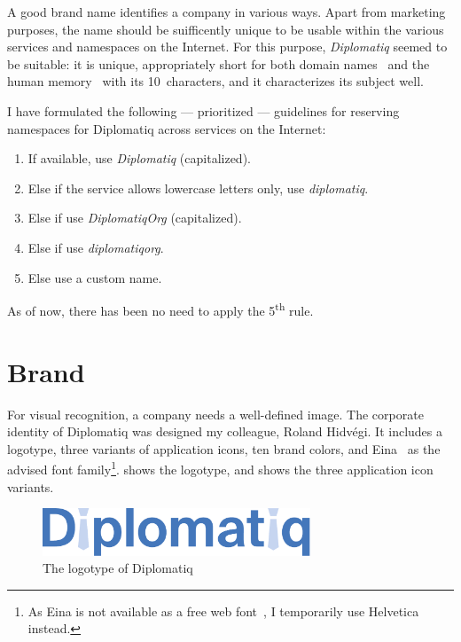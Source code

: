 A good brand name identifies a company in various ways. Apart from marketing purposes, the name should be suifficently unique to be usable within the various services and namespaces on the Internet. For this purpose, \emph{Diplomatiq} seemed to be suitable: it is unique, appropriately short for both domain names~\cite{howtochoosedomainname} and the human memory~\cite{memoryfour} with its 10~characters, and it characterizes its subject well.

I have formulated the following — prioritized — guidelines for reserving namespaces for Diplomatiq across services on the Internet:

\begin{enumerate}
\item If available, use \emph{Diplomatiq} (capitalized).
\item Else if the service allows lowercase letters only, use \emph{diplomatiq}.
\item Else if use \emph{DiplomatiqOrg} (capitalized).
\item Else if use \emph{diplomatiqorg}.
\item Else use a custom name.
\end{enumerate}

As of now, there has been no need to apply the 5\textsuperscript{th} rule.

\section{Brand}

For visual recognition, a company needs a well-defined image. The corporate identity of Diplomatiq was designed my colleague, Roland Hidvégi. It includes a logotype, three variants of application icons, ten brand colors, and Eina~\cite{eina} as the advised font family\footnote{As Eina is not available as a free web font~\cite{eina-licensing}, I temporarily use Helvetica instead.}.  shows the logotype, and  shows the three application icon variants.

\begin{figure}[!htb]
    \centering
    \vspace{2mm}
    \includegraphics[width=8cm]{figures/diplomatiq-logo.pdf}
    \caption{The logotype of Diplomatiq}
    \label{fig:diplomatiq-logotype}
\end{figure}

